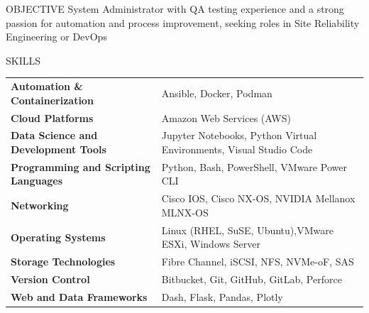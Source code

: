 \documentclass{faang} %
\begin{document}

\begin{rSection}{OBJECTIVE}
{System Administrator with QA testing experience and a strong passion for automation and process improvement, seeking roles in Site Reliability Engineering or DevOps}
\end{rSection}


\begin{rSection}{SKILLS}
\begin{tabular}{ @{} >{\bfseries}l @{\hspace{6ex}} l }
Automation \& Containerization & Ansible, Docker, Podman\\
Cloud Platforms & Amazon Web Services (AWS)\\
Data Science and Development Tools & Jupyter Notebooks, Python Virtual Environments, Visual Studio Code\\
Programming and Scripting Languages & Python, Bash, PowerShell, VMware Power CLI\\
Networking & Cisco IOS, Cisco NX-OS, NVIDIA Mellanox MLNX-OS\\
Operating Systems & Linux (RHEL, SuSE, Ubuntu),VMware ESXi, Windows Server\\
Storage Technologies & Fibre Channel, iSCSI, NFS, NVMe-oF, SAS\\
Version Control & Bitbucket, Git, GitHub, GitLab, Perforce\\
Web and Data Frameworks & Dash, Flask, Pandas, Plotly
\end{tabular}\\
\end{rSection}

\end{document}
